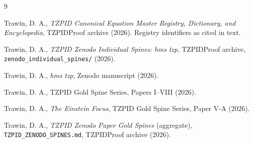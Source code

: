 \documentclass[11pt]{article}
\theoremstyle{remark}
\begin{document}
\begin{thebibliography}{9}

 Trawin, D. A., \emph{TZPID Canonical Equation Master Registry, Dictionary, and Encyclopedia}, TZPIDProof archive (2026). Registry identifiers as cited in text.

 Trawin, D. A., \emph{TZPID Zenodo Individual Spines: hms tzp}, TZPIDProof archive, \texttt{zenodo\_individual\_spines/} (2026).

 Trawin, D. A., \emph{hms tzp}, Zenodo manuscript (2026).

 Trawin, D. A., TZPID Gold Spine Series, Papers I--VIII (2026).

 Trawin, D. A., \emph{The Einstein Focus}, TZPID Gold Spine Series, Paper V-A (2026).

 Trawin, D. A., \emph{TZPID Zenodo Paper Gold Spines} (aggregate), \texttt{TZPID\_ZENODO\_SPINES.md}, TZPIDProof archive (2026).

\end{thebibliography}
\end{document}
